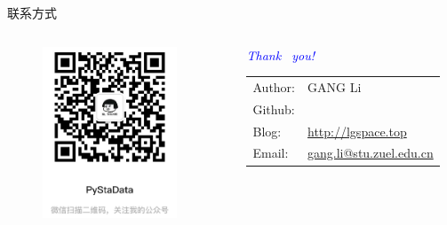 \documentclass[UTF8]{ctexbeamer}
\begin{document}
\begin{frame}{联系方式}
\begin{columns}
\begin{column}{.4\linewidth}
\begin{figure}
\includegraphics[width=40mm]{figures/Wechat_QR.jpeg}
\end{figure}
\end{column}
\begin{column}{.6\linewidth}
{\huge \emph{\textcolor{blue}{Thank  ~you!}}}\\
\vspace{5mm}\large
\begin{tabular}{ll}
{\sc Author}:  & GANG Li\\
{\sc Github}: & \href{https://github.com/GangLi-0814}{\color{blue}{GangLi-0814}}\\
{\sc Blog}: & \href{http://lgspace.top}{\color{blue}http://lgspace.top}\\
{\sc Email}: & \href{mailto:gang.li@stu.zuel.edu.cn}{\color{blue}gang.li@stu.zuel.edu.cn}\\
\end{tabular}
\end{column}
\end{columns}
\end{frame}
\end{document}
